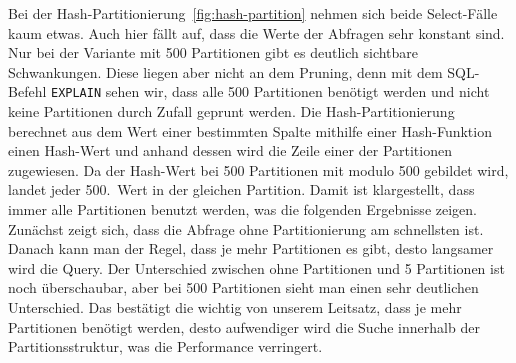 Bei der Hash-Partitionierung~\ref{fig:hash-partition} nehmen sich beide Select-Fälle kaum etwas.
Auch hier fällt auf, dass die Werte der Abfragen sehr konstant sind.
Nur bei der Variante mit 500 Partitionen gibt es deutlich sichtbare Schwankungen.
Diese liegen aber nicht an dem Pruning, denn mit dem SQL-Befehl \texttt{EXPLAIN} sehen wir, dass alle 500 Partitionen benötigt werden und nicht keine Partitionen durch Zufall geprunt werden.
Die Hash-Partitionierung berechnet aus dem Wert einer bestimmten Spalte mithilfe einer Hash-Funktion einen Hash-Wert und anhand dessen wird die Zeile einer der Partitionen zugewiesen.
Da der Hash-Wert bei 500 Partitionen mit modulo 500 gebildet wird, landet jeder 500.\ Wert in der gleichen Partition.
Damit ist klargestellt, dass immer alle Partitionen benutzt werden, was die folgenden Ergebnisse zeigen.
Zunächst zeigt sich, dass die Abfrage ohne Partitionierung am schnellsten ist.
Danach kann man der Regel, dass je mehr Partitionen es gibt, desto langsamer wird die Query.
Der Unterschied zwischen ohne Partitionen und 5 Partitionen ist noch überschaubar, aber bei 500 Partitionen sieht man einen sehr deutlichen Unterschied.
Das bestätigt die wichtig von unserem Leitsatz, dass je mehr Partitionen benötigt werden, desto aufwendiger wird die Suche innerhalb der Partitionsstruktur, was die Performance verringert.


